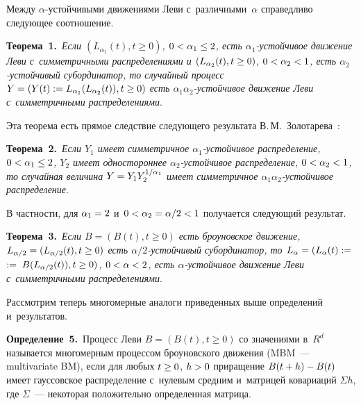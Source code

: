 \begin{multicols}{2}
Между $\alpha$-устойчивыми движениями Леви с~различными~$\alpha$ справедливо 
следующее соотношение.

\smallskip

\noindent
\textbf{Теорема~1.}\
\textit{Если $(L_{\alpha_1 } (t), t\geq 0)$, $0\hm< \alpha_1 \hm\leq 2$, есть 
$\alpha_1$-устой\-чи\-вое движение Леви с~симметричными распределениями и
$(L_{\alpha_2 } (t), t\hm\geq 0)$, $0\hm<\alpha_2 \hm<1$, есть $\alpha_2$-устой\-чи\-вый 
субординатор, то случайный процесс
$Y \hm= (Y(t):= L_{\alpha_1 } (L_{\alpha_2} (t)), t\hm\geq 0)$
есть $\alpha_1 \alpha_2$-устой\-чи\-вое движение Леви с~симметричными распределениями}.


\smallskip

Эта теорема есть прямое следствие следующего результата 
В.\,М.~Золотарева~\cite[теорема~3.3.1.]{Zol83}:

\smallskip

\noindent
\textbf{Теорема~2.}\
\textit{Если $Y_1$ имеет симметричное $\alpha_1$-устой\-чи\-вое распределение, 
$0\hm<\alpha_1 \hm\leq 2$, $Y_2$ имеет одностороннее
$\alpha_2$-устой\-чи\-вое распределение, $0\hm<\alpha_2 \hm<1$, то случайная величина
$Y \hm= Y_1 Y_2^{1/\alpha_1}$ имеет симметричное $\alpha_1\alpha_2$-устой\-чи\-вое 
распределение}.


\smallskip

В частности, для $\alpha_1 \hm=2$ и~$0\hm<\alpha_2 \hm=\alpha/2 \hm<1$
получается следующий результат.

\smallskip

\noindent
\textbf{Теорема~3.}\
\textit{Если $B= (B(t), t\geq 0)$ есть броуновское движение,
$L_{\alpha/2} \hm= (L_{\alpha/2} (t) , t\hm\geq 0)$ есть $\alpha/2$-устой\-чи\-вый 
субординатор,
то $L_{\alpha} \hm= (L_{\alpha} (t) :=$\linebreak $:=\;B(L_{\alpha/2} (t)), t\hm\geq 0)$, 
$0\hm<\alpha \hm<2$, есть
$\alpha$-устой\-чи\-вое движение Леви с~симметричными распределениями}.


\smallskip

Рассмотрим теперь многомерные аналоги приведенных выше определений и~результатов.

\smallskip

\noindent
\textbf{Определение~5.}\
Процесс Леви $B = (B(t), t\geq 0)$ со значениями в~$R^d$ 
называется многомерным процессом броуновского движения (MBM~--- multivariate BM), если
для любых $t\hm\geq 0$, $h\hm>0$ приращение $B(t+h)\hm -B(t)$ имеет 
гауссовское распределение с~нулевым средним 
и~матрицей ковариаций $\Sigma h$, где $\Sigma$~--- некоторая 
положительно определенная мат\-рица.



\end{multicols}

